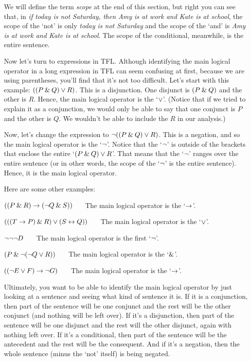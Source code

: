 We will define the term \textit{scope} at the end of this section, but right you can see that, in \textit{if today is not Saturday, then Amy is at work and Kate is at school}, the scope of the `not' is only \textit{today is not Saturday} and the scope of the `and' is \textit{Amy is at work and Kate is at school}. The scope of the conditional, meanwhile, is the entire sentence.  

Now let's turn to expressions in TFL. Although identifying the main logical operator in a long expression in TFL can seem confusing at first, because we are using parentheses, you'll find that it's not too difficult. Let's start with this example: $((P \mathbin{\&} Q) \vee R)$. This is a disjunction. One disjunct is $(P \mathbin{\&} Q)$ and the other is $R$. Hence, the main logical operator is the `$\vee$'. (Notice that if we tried to explain it as a conjunction, we would only be able to say that one conjunct is $P$ and the other is $Q$. We wouldn't be able to include the $R$ in our analysis.)

Now, let's change the expression to ${\neg}((P \mathbin{\&} Q) \vee R)$. This is a negation, and so the main logical operator is the `${\neg}$'. Notice that the `${\neg}$' is outside of the brackets that enclose the entire `$(P \mathbin{\&} Q) \vee R$'. That means that the `${\neg}$' ranges over the entire sentence (or in other words, the scope of the `${\neg}$' is the entire sentence). Hence, it is the main logical operator. 

Here are some other examples:
\begin{earg}
\item[\ex{logic-operator1}] $((P \mathbin{\&} R) \rightarrow ({\neg} Q \mathbin{\&} S))$ ~~~The main logical operator is the `$\rightarrow$'. 
\item[\ex{logic-operator2}] $(((T \rightarrow P) \mathbin{\&} R) \vee (S \leftrightarrow Q))$ ~~~The main logical operator is the `$\vee$'.
\item[\ex{logic-operator3}] ${\neg}{\neg}{\neg} D$ ~~~The main logical operator is the first `${\neg}$'.
\item[\ex{logic-operator4}] $(P \mathbin{\&} {\neg} ({\neg} Q \vee R))$ ~~~The main logical operator is the `$\mathbin{\&}$'. 
\item[\ex{logic-operator5}] $(({\neg} E \vee F) \rightarrow {\neg} G)$ ~~~The main logical operator is the `$\rightarrow$'.
\end{earg}

Ultimately, you want to be able to identify the main logical operator by just looking at a sentence and seeing what kind of sentence it is. If it is a conjunction, then part of the sentence will be one conjunct and the rest will be the other conjunct (and nothing will be left over). If it's a disjunction, then part of the sentence will be one disjunct and the rest will the other disjunct, again with nothing left over. If it's a conditional, then part of the sentence will be the antecedent and the rest will be the consequent. And if it's a negation, then the whole sentence (minus the `not' itself) is being negated.

